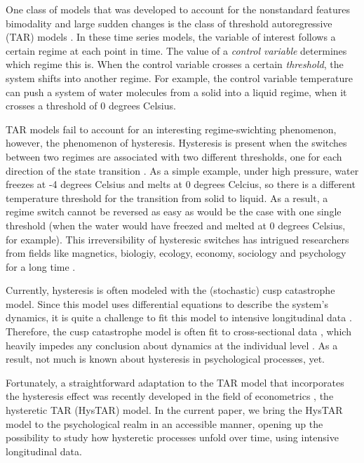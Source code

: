 \documentclass{article}
\begin{document}
One class of models that was developed to account for the nonstandard features bimodality and large sudden changes is the class of threshold autoregressive (TAR) models \citep{tar}.
In these time series models, the variable of interest follows a certain regime at each point in time. 
The value of a \textit{control variable} determines which regime this is. 
When the control variable crosses a certain \textit{threshold}, the system shifts into another regime.
For example, the control variable temperature can push a system of water molecules from a solid into a liquid regime, when it crosses a threshold of 0 degrees Celsius.

TAR models fail to account for an interesting regime-swichting phenomenon, however, the phenomenon of hysteresis. 
Hysteresis is present when the switches between two regimes are associated with two different thresholds, one for each direction of the state transition \citep{gilmore, strogatz}.
As a simple example, under high pressure, water freezes at -4 degrees Celsius and melts at 0 degrees Celcius, so there is a different temperature threshold for the transition from solid to liquid. As a result, a regime switch cannot be reversed as easy as would be the case with one single threshold (when the water would have freezed and melted at 0 degrees Celsius, for example).
This irreversibility of hysteresic switches has intrigued researchers from fields like magnetics, biologiy, ecology, economy, sociology and psychology for a long time \citep{hysteresis_mathematical}.

Currently, hysteresis is often modeled with the (stochastic) cusp catastrophe model. Since this model uses differential equations to describe the system's dynamics, it is quite a challenge to fit this model to intensive longitudinal data \citep{cobb, CT_limitations1, CT_limitations2, cuspfit}. 
Therefore, the cusp catastrophe model is often fit to cross-sectional data \citep[e.g.,][]{cusp_example_1, cusp_example_2, cusp_example_3}, which heavily impedes any conclusion about dynamics at the individual level \citep{molenaar_manifesto, hamaker_within}.
As a result, not much is known about hysteresis in psychological processes, yet.

Fortunately, a straightforward adaptation to the TAR model that incorporates the hysteresis effect was recently developed in the field of econometrics \citep{bar2}, the hysteretic TAR (HysTAR) model.
In the current paper, we bring the HysTAR model to the psychological realm in an accessible manner, opening up the possibility to study how hysteretic processes unfold over time, using intensive longitudinal data.
\end{document}
